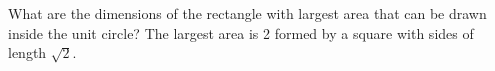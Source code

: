 {What are the dimensions of the rectangle with largest area that can be drawn inside the unit circle?
}
{The largest area is 2 formed by a square with sides of length $\sqrt{2}$.
}

